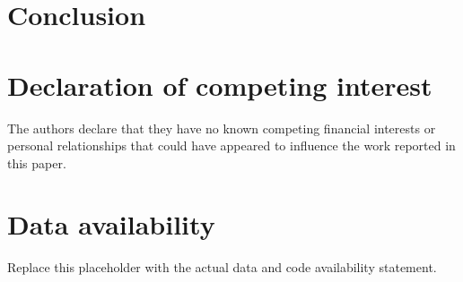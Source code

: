 \documentclass[a4paper,fleqn]{cas-sc}
\begin{document}

\section{Conclusion}
\label{sec:conclusion}


\section*{Declaration of competing interest}
The authors declare that they have no known competing financial interests or personal relationships that could have appeared to influence the work reported in this paper.

\section*{Data availability}
Replace this placeholder with the actual data and code availability statement.



\end{document}
